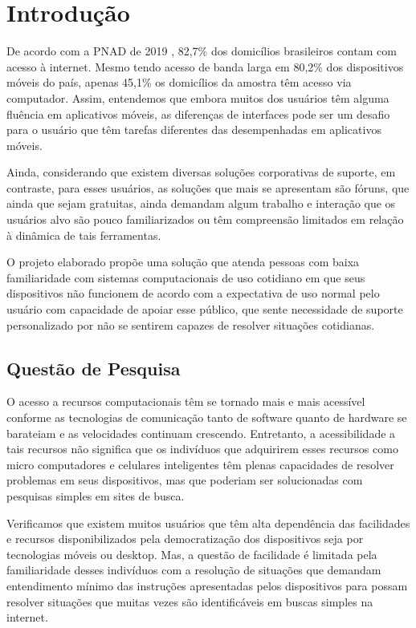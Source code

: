 
\chapter[Introdução]{Introdução}

	De acordo com a PNAD de 2019 \citeauthor{PNAD:2019}, 82,7\% dos domicílios brasileiros contam com acesso à internet. Mesmo tendo acesso de banda larga em 80,2\% dos dispositivos móveis do país, apenas 45,1\% os domicílios da amostra têm acesso via computador. Assim, entendemos que embora muitos dos usuários têm alguma fluência em aplicativos móveis, as diferenças de interfaces pode ser um desafio para o usuário que têm tarefas diferentes das desempenhadas em aplicativos móveis.
	
	Ainda, considerando que existem diversas soluções corporativas de suporte, em contraste, para esses usuários, as soluções que mais se apresentam são fóruns, que ainda que sejam gratuitas, ainda demandam algum trabalho e interação que os usuários alvo são pouco familiarizados ou têm compreensão limitados em relação à dinâmica de tais ferramentas.
		
	O projeto elaborado propõe uma solução que atenda pessoas com baixa familiaridade com sistemas computacionais de uso cotidiano em que seus dispositivos não funcionem de acordo com a expectativa de uso normal pelo usuário com capacidade de apoiar esse público, que sente necessidade de suporte personalizado por não se sentirem capazes de resolver situações cotidianas.

	\section[Questão de Pesquisa]{Questão de Pesquisa}
	
		O acesso a recursos computacionais têm se tornado mais e mais acessível conforme as tecnologias de comunicação tanto de software quanto de hardware se barateiam e as velocidades continuam crescendo. Entretanto, a acessibilidade a tais recursos não significa que os indivíduos que adquirirem esses recursos como micro computadores e celulares inteligentes têm plenas capacidades de resolver problemas em seus dispositivos, mas que poderiam ser solucionadas com pesquisas simples em sites de busca.
		
		Verificamos que existem muitos usuários que têm alta dependência das facilidades e recursos disponibilizados pela democratização dos dispositivos seja por tecnologias móveis ou desktop. Mas, a questão de facilidade é limitada pela familiaridade desses indivíduos com a resolução de situações que demandam entendimento mínimo das instruções apresentadas pelos dispositivos para possam resolver situações que muitas vezes são identificáveis em buscas simples na internet.
		
